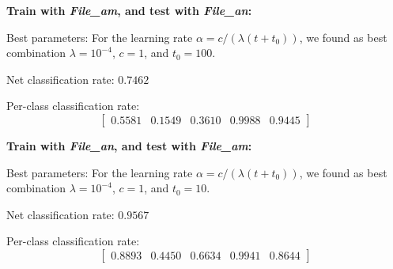 \documentclass[letterpaper]{article}
\begin{document}
\textbf{Train with \textit{File\_am}, and test with \textit{File\_an}:}

Best parameters: For the learning rate $\alpha = c/(\lambda(t + t_0))$,
we found as best combination $\lambda = 10^{-4}$, $c = 1$, and $t_0 = 100$.

Net classification rate: $0.7462$

Per-class classification rate: 
\[
\begin{bmatrix} 0.5581 & 0.1549 & 0.3610 & 0.9988 & 0.9445\end{bmatrix}
\]

\textbf{Train with \textit{File\_an}, and test with \textit{File\_am}:}

Best parameters: For the learning rate $\alpha = c/(\lambda(t + t_0))$,
we found as best combination $\lambda = 10^{-4}$, $c = 1$, and $t_0 = 10$.

Net classification rate: $0.9567$

Per-class classification rate: 
\[
\begin{bmatrix}
0.8893    & 0.4450    & 0.6634    & 0.9941    & 0.8644
\end{bmatrix}
\]
\end{document}
